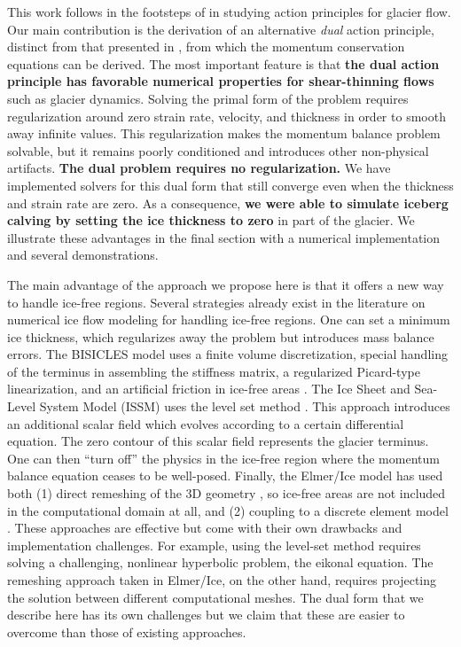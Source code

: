 \documentclass[review,oneside]{igs}
\begin{document}
This work follows in the footsteps of \citet{dukowicz2010consistent} in studying action principles for glacier flow.
Our main contribution is the derivation of an alternative \emph{dual} action principle, distinct from that presented in \citet{dukowicz2010consistent}, from which the momentum conservation equations can be derived.
The most important feature is that \textbf{the dual action principle has favorable numerical properties for shear-thinning flows} such as glacier dynamics.
Solving the primal form of the problem requires regularization around zero strain rate, velocity, and thickness in order to smooth away infinite values.
This regularization makes the momentum balance problem solvable, but it remains poorly conditioned and introduces other non-physical artifacts.
\textbf{The dual problem requires no regularization.}
We have implemented solvers for this dual form that still converge even when the thickness and strain rate are zero.
As a consequence, \textbf{we were able to simulate iceberg calving by setting the ice thickness to zero} in part of the glacier.
We illustrate these advantages in the final section with a numerical implementation and several demonstrations.

The main advantage of the approach we propose here is that it offers a new way to handle ice-free regions.
Several strategies already exist in the literature on numerical ice flow modeling for handling ice-free regions.
One can set a minimum ice thickness, which regularizes away the problem but introduces mass balance errors.
The BISICLES model uses a finite volume discretization, special handling of the terminus in assembling the stiffness matrix, a regularized Picard-type linearization, and an artificial friction in ice-free areas \citep{cornford2013adaptive}.
The Ice Sheet and Sea-Level System Model (ISSM) uses the level set method \citep{bondzio2016modelling, osher1988fronts}.
This approach introduces an additional scalar field which evolves according to a certain differential equation.
The zero contour of this scalar field represents the glacier terminus.
One can then ``turn off'' the physics in the ice-free region where the momentum balance equation ceases to be well-posed.
Finally, the Elmer/Ice model has used both (1) direct remeshing of the 3D geometry \citep{todd2018full}, so ice-free areas are not included in the computational domain at all, and (2) coupling to a discrete element model \citep{benn2017melt}.
These approaches are effective but come with their own drawbacks and implementation challenges.
For example, using the level-set method requires solving a challenging, nonlinear hyperbolic problem, the eikonal equation.
The remeshing approach taken in Elmer/Ice, on the other hand, requires projecting the solution between different computational meshes.
The dual form that we describe here has its own challenges but we claim that these are easier to overcome than those of existing approaches.
\end{document}
